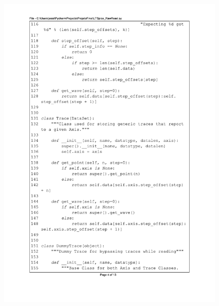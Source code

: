 \begin{figure}[H]
\centering
\includegraphics[scale=0.9]{01_Pre_textuais/code/leitura4.pdf}
\end{figure}
